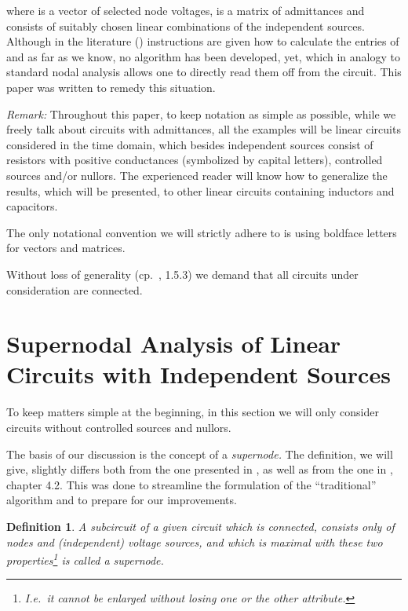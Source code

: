 \documentclass[10pt,journal,twocolumn,pagenumbers]{IEEEtran}
\newtheorem{definition}[theorem]{Definition}
\begin{document}
where  is a vector of selected node voltages,  is a matrix of admittances and  consists of suitably chosen linear combinations of the independent sources. Although in the literature (\cite{ChenDavis,Davis}) instructions are given how to calculate the entries  of   and   as far as we know, no algorithm has been developed, yet, which in analogy to standard nodal analysis allows one to directly read them off from the circuit. This paper was written to remedy this situation.

\smallskip
{\em Remark:}\;
Throughout this paper, to keep notation as simple as possible, while we freely talk about circuits with admittances, all the examples will be linear circuits con\-sider\-ed in the time domain, which besides independent sources consist of resistors with positive conductances (symbolized by capital letters), controlled sources and/or nullors. The experienced reader will know how to generalize the results, which will be presented, to other linear circuits containing inductors and capacitors.

The only notational convention we will strictly adhere to is using boldface letters for vectors and matrices. 

\smallskip
Without loss of generality (cp.\ \cite{ChuaDesoerKuh}, 1.5.3) we demand that all circuits under consideration are connected.





\section{Supernodal Analysis of Linear Circuits with Independent Sources}

To keep matters simple at the beginning, in this section we will only consider circuits without controlled sources and nullors.

The basis of our discussion is the concept of a {\em super\-node.} The definition, we will give, slightly differs both from the one presented in \cite{SommerSuper}, as well as from the one in \cite{Davis}, chapter 4.2. This was done to streamline the formulation of the ``traditional'' algorithm and to prepare for our improvements.

\smallskip
\begin{definition}
\label{super1}
A subcircuit of a given circuit which is connected, consists only of nodes and (independent) voltage sources, and which is maximal with these two properties\footnote
{I.e.\ it cannot be enlarged without losing one or the other attribute.} is called a {\em supernode.}  
\end{definition}
\end{document}
